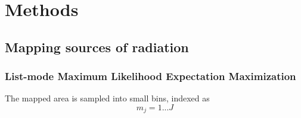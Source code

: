 
\chapter{Methods\label{chap:methods}}

\section{Mapping sources of radiation}


\subsection{List-mode Maximum Likelihood Expectation Maximization}

The mapped area is sampled into small bins, indexed as 
\begin{equation}

m_{j} = 1 ... J

\end{equation}



